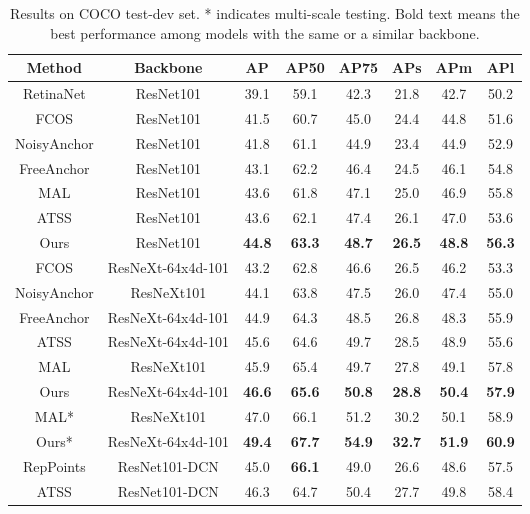 \documentclass[runningheads]{llncs}
\begin{document}
\begin{table}[t]
\begin{center}
\caption {Results on COCO test-dev set. * indicates multi-scale testing. Bold text means the best performance among models with the same or a similar backbone.}
\begin{tabular}{c|c|ccc|ccc}
\hline
Method & Backbone & AP & AP50 & AP75 & APs & APm & APl \\
\hline
RetinaNet\cite{focal} & ResNet101 & 39.1 & 59.1 & 42.3 & 21.8 & 42.7 & 50.2\\
FCOS\cite{fcos} & ResNet101 & 41.5 & 60.7 & 45.0 & 24.4 & 44.8 & 51.6\\
NoisyAnchor\cite{noisy} &  ResNet101 & 41.8 & 61.1 & 44.9 & 23.4 & 44.9 & 52.9\\
FreeAnchor\cite{freeanchor} & ResNet101 & 43.1 & 62.2 & 46.4 & 24.5 & 46.1 & 54.8\\
MAL\cite{mal} &  ResNet101 & 43.6 & 61.8 & 47.1 & 25.0 & 46.9 & 55.8\\
ATSS\cite{atss} & ResNet101 & 43.6 & 62.1 & 47.4 & 26.1 & 47.0 & 53.6 \\
Ours & ResNet101 & \textbf{44.8} & \textbf{63.3} & \textbf{48.7} & \textbf{26.5} & \textbf{48.8} & \textbf{56.3} \\
\hline
FCOS\cite{fcos} & ResNeXt-64x4d-101 & 43.2 & 62.8 & 46.6 & 26.5 & 46.2 & 53.3 \\
NoisyAnchor\cite{noisy} & ResNeXt101 & 44.1 & 63.8 & 47.5 & 26.0 & 47.4 & 55.0 \\
FreeAnchor\cite{freeanchor} & ResNeXt-64x4d-101 & 44.9 & 64.3 & 48.5 & 26.8 & 48.3 & 55.9 \\
ATSS\cite{atss} & ResNeXt-64x4d-101 & 45.6 & 64.6 & 49.7 & 28.5 & 48.9 & 55.6 \\
MAL\cite{mal} & ResNeXt101 & 45.9 & 65.4 & 49.7 & 27.8 & 49.1 & 57.8 \\
Ours & ResNeXt-64x4d-101 & \textbf{46.6} & \textbf{65.6} & \textbf{50.8} & \textbf{28.8} & \textbf{50.4} & \textbf{57.9} \\
\hline
MAL\cite{mal}* & ResNeXt101 & 47.0 & 66.1 & 51.2 & 30.2 & 50.1 & 58.9 \\
Ours* & ResNeXt-64x4d-101 & \textbf{49.4} & \textbf{67.7} & \textbf{54.9} & \textbf{32.7} & \textbf{51.9} & \textbf{60.9} \\
\hline
RepPoints\cite{reppoints} & ResNet101-DCN & 45.0 & \textbf{66.1} & 49.0 & 26.6 & 48.6 & 57.5 \\
ATSS\cite{atss} & ResNet101-DCN & 46.3 & 64.7 & 50.4 & 27.7 & 49.8 & 58.4 \\

\end{tabular}
\end{center}
\end{table}
\end{document}
